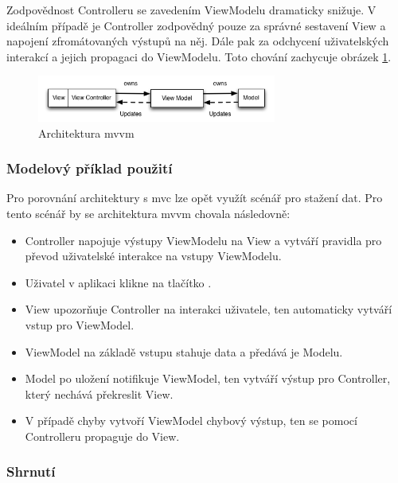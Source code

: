 
Zodpovědnost Controlleru se zavedením ViewModelu dramaticky snižuje.
V ideálním případě je Controller zodpovědný pouze za správné sestavení View a napojení zfromátovaných výstupů na něj.
Dále pak za odchycení uživatelských interakcí a jejich propagaci do ViewModelu.
Toto chování zachycuje obrázek \ref{architektura-mvvm}.

\begin{figure}\centering
	\includegraphics[width=0.7\textwidth]{assets/mvvm-architecture.png}
	\caption[Architektura \acrshort{mvvm}]{Architektura \acrshort{mvvm}}\label{architektura-mvvm}
\end{figure}

\subsubsection*{Modelový příklad použití} \label{architektura-mvvm-priklad}

Pro porovnání architektury s \acrshort{mvc} lze opět využít scénář pro stažení dat.
Pro tento scénář by se architektura \acrshort{mvvm} chovala následovně:
\begin{itemize}
  \item Controller napojuje výstupy ViewModelu na View a vytváří pravidla pro převod uživatelské interakce na vstupy ViewModelu.
  \item Uživatel v aplikaci klikne na tlačítko .
  \item View upozorňuje Controller na interakci uživatele, ten automaticky vytváří vstup pro ViewModel.
  \item ViewModel na základě vstupu stahuje data a předává je Modelu.
  \item Model po uložení notifikuje ViewModel, ten vytváří výstup pro Controller, který nechává překreslit View.
  \item V případě chyby vytvoří ViewModel chybový výstup, ten se pomocí Controlleru propaguje do View.
\end{itemize}

\subsubsection*{Shrnutí} \label{architektura-mvvm-shrnuti}

